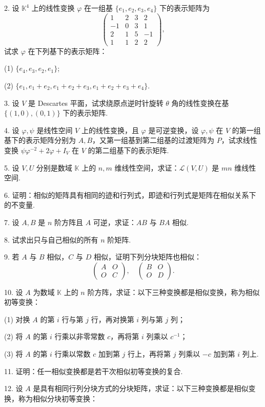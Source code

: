 \documentclass[UTF8,12pt,a4paper,fontset=fandol]{ctexart}
\begin{document}
2. 设 $\mathbb{K}^4$ 上的线性变换 $\varphi$ 在一组基 $\{e_1,e_2,e_3,e_4\}$ 下的表示矩阵为
\[
\left(\begin{array}{rrrr}
1 & 2 & 3 & 2\\
-1 & 0 & 3 & 1\\
2 & 1 & 5 & -1\\
1 & 1 & 2 & 2
\end{array}\right),
\]
试求 $\varphi$ 在下列基下的表示矩阵：

(1) $\{e_4,e_3,e_2,e_1\}$;

(2) $\{e_1,e_1+e_2,e_1+e_2+e_3,e_1+e_2+e_3+e_4\}$.

3. 设 $V$ 是 Descartes 平面，试求绕原点逆时针旋转 $\theta$ 角的线性变换在基 $\{(1,0),(0,1)\}$ 下的表示矩阵.

4. 设 $\varphi,\psi$ 是线性空间 $V$ 上的线性变换，且 $\varphi$ 是可逆变换，设 $\varphi,\psi$ 在 $V$ 的第一组基下的表示矩阵分别为 $A,B$，又第一组基到第二组基的过渡矩阵为 $P$，试求线性变换 $\psi\varphi^{-2}+2\varphi+I_V$ 在 $V$ 的第二组基下的表示矩阵.

5. 设 $V,U$ 分别是数域 $\mathbb{K}$ 上的 $n,m$ 维线性空间，求证：$\mathcal{L}(V,U)$ 是 $mn$ 维线性空间.

6. 证明：相似的矩阵具有相同的迹和行列式，即迹和行列式是矩阵在相似关系下的不变量.

7. 设 $A,B$ 是 $n$ 阶方阵且 $A$ 可逆，求证：$AB$ 与 $BA$ 相似.

8. 试求出只与自己相似的所有 $n$ 阶矩阵.

9. 若 $A$ 与 $B$ 相似，$C$ 与 $D$ 相似，证明下列分块矩阵也相似：
\[
\left(\begin{array}{cc}
A & O\\
O & C
\end{array}\right),\quad
\left(\begin{array}{cc}
B & O\\
O & D
\end{array}\right).
\]

10. 设 $A$ 为数域 $\mathbb{K}$ 上的 $n$ 阶方阵，求证：以下三种变换都是相似变换，称为相似初等变换：

(1) 对换 $A$ 的第 $i$ 行与第 $j$ 行，再对换第 $i$ 列与第 $j$ 列；

(2) 将 $A$ 的第 $i$ 行乘以非零常数 $c$，再将第 $i$ 列乘以 $c^{-1}$；

(3) 将 $A$ 的第 $i$ 行乘以常数 $c$ 加到第 $j$ 行上，再将第 $j$ 列乘以 $-c$ 加到第 $i$ 列上.

11. 证明：任一相似变换都是若干次相似初等变换的复合.

12. 设 $A$ 是具有相同行列分块方式的分块矩阵，求证：以下三种变换都是相似变换，称为相似分块初等变换：
\end{document}
